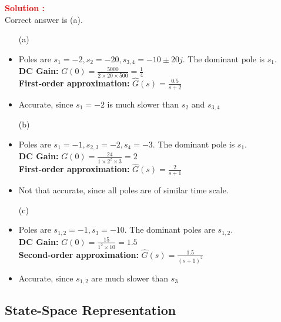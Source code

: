 \documentclass[12pt]{article}
\begin{document}
\textbf{\textcolor{red}{Solution :}}\\
Correct answer is (a).\\
\begin{itemize}
    \item[(a)] 
    \item Poles are \(s_1 = -2,s_2 = -20,s_{3,4} = -10 \pm 20 j\). The dominant pole is \(s_1\). \\
    \textbf{DC Gain:} \(G(0) = \frac{5000}{2\times20 \times 500} = \frac{1}{4} \) \\
    \textbf{First-order approximation:} \(\hat{G}(s) = \frac{0.5}{s+2}\)
    \item Accurate, since \(s_1 = -2\) is much slower than \(s_2\) and \(s_{3,4}\) 
    \item[(b)]
    \item Poles are \(s_1 = -1,s_{2,3} = -2,s_4 = -3 \). The dominant pole is \(s_1\). \\
    \textbf{DC Gain:} \(G(0) = \frac{24}{1\times2^2 \times 3} = 2 \) \\
    \textbf{First-order approximation:} \(\hat{G}(s) = \frac{2}{s+1}\)
    \item Not that accurate, since all poles are of similar time scale. 
    \item[(c)]
    \item Poles are \(s_{1,2} = -1,s_3 = -10\). The dominant poles are \(s_{1,2}\). \\
    \textbf{DC Gain:} \(G(0) = \frac{15}{1^2\times 10} = 1.5 \) \\
    \textbf{Second-order approximation:} \(\hat{G}(s) = \frac{1.5}{(s+1)^2}\)
    \item Accurate, since \(s_{1,2}\) are much slower than \(s_3\) 
\end{itemize}
\clearpage

\subsection{State-Space Representation}
\end{document}
